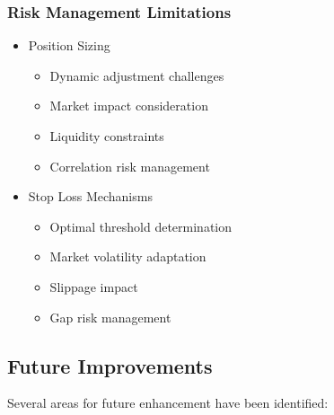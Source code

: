 \documentclass[conference]{IEEEtran}
\begin{document}
\subsubsection{Risk Management Limitations}
\begin{itemize}
    \item Position Sizing
    \begin{itemize}
        \item Dynamic adjustment challenges
        \item Market impact consideration
        \item Liquidity constraints
        \item Correlation risk management
    \end{itemize}
    
    \item Stop Loss Mechanisms
    \begin{itemize}
        \item Optimal threshold determination
        \item Market volatility adaptation
        \item Slippage impact
        \item Gap risk management
    \end{itemize}
\end{itemize}

\subsection{Future Improvements}
Several areas for future enhancement have been identified:
\end{document}
